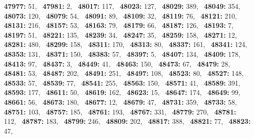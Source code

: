 \textbf{47977:} 51,\allowbreak~ 
\textbf{47981:} 2,\allowbreak~ 
\textbf{48017:} 117,\allowbreak~ 
\textbf{48023:} 127,\allowbreak~ 
\textbf{48029:} 389,\allowbreak~ 
\textbf{48049:} 354,\allowbreak~ 
\textbf{48073:} 120,\allowbreak~ 
\textbf{48079:} 54,\allowbreak~ 
\textbf{48091:} 89,\allowbreak~ 
\textbf{48109:} 32,\allowbreak~ 
\textbf{48119:} 76,\allowbreak~ 
\textbf{48121:} 210,\allowbreak~ 
\textbf{48131:} 216,\allowbreak~ 
\textbf{48157:} 53,\allowbreak~ 
\textbf{48163:} 79,\allowbreak~ 
\textbf{48179:} 66,\allowbreak~ 
\textbf{48187:} 126,\allowbreak~ 
\textbf{48193:} 7,\allowbreak~ 
\textbf{48197:} 51,\allowbreak~ 
\textbf{48221:} 135,\allowbreak~ 
\textbf{48239:} 34,\allowbreak~ 
\textbf{48247:} 35,\allowbreak~ 
\textbf{48259:} 158,\allowbreak~ 
\textbf{48271:} 12,\allowbreak~ 
\textbf{48281:} 480,\allowbreak~ 
\textbf{48299:} 158,\allowbreak~ 
\textbf{48311:} 170,\allowbreak~ 
\textbf{48313:} 80,\allowbreak~ 
\textbf{48337:} 161,\allowbreak~ 
\textbf{48341:} 124,\allowbreak~ 
\textbf{48353:} 131,\allowbreak~ 
\textbf{48371:} 150,\allowbreak~ 
\textbf{48383:} 57,\allowbreak~ 
\textbf{48397:} 5,\allowbreak~ 
\textbf{48407:} 134,\allowbreak~ 
\textbf{48409:} 178,\allowbreak~ 
\textbf{48413:} 97,\allowbreak~ 
\textbf{48437:} 3,\allowbreak~ 
\textbf{48449:} 41,\allowbreak~ 
\textbf{48463:} 150,\allowbreak~ 
\textbf{48473:} 67,\allowbreak~ 
\textbf{48479:} 28,\allowbreak~ 
\textbf{48481:} 53,\allowbreak~ 
\textbf{48487:} 202,\allowbreak~ 
\textbf{48491:} 251,\allowbreak~ 
\textbf{48497:} 108,\allowbreak~ 
\textbf{48523:} 80,\allowbreak~ 
\textbf{48527:} 148,\allowbreak~ 
\textbf{48533:} 57,\allowbreak~ 
\textbf{48539:} 77,\allowbreak~ 
\textbf{48541:} 255,\allowbreak~ 
\textbf{48563:} 150,\allowbreak~ 
\textbf{48571:} 41,\allowbreak~ 
\textbf{48589:} 391,\allowbreak~ 
\textbf{48593:} 177,\allowbreak~ 
\textbf{48611:} 50,\allowbreak~ 
\textbf{48619:} 162,\allowbreak~ 
\textbf{48623:} 15,\allowbreak~ 
\textbf{48647:} 174,\allowbreak~ 
\textbf{48649:} 99,\allowbreak~ 
\textbf{48661:} 56,\allowbreak~ 
\textbf{48673:} 180,\allowbreak~ 
\textbf{48677:} 12,\allowbreak~ 
\textbf{48679:} 47,\allowbreak~ 
\textbf{48731:} 359,\allowbreak~ 
\textbf{48733:} 58,\allowbreak~ 
\textbf{48751:} 103,\allowbreak~ 
\textbf{48757:} 185,\allowbreak~ 
\textbf{48761:} 193,\allowbreak~ 
\textbf{48767:} 331,\allowbreak~ 
\textbf{48779:} 270,\allowbreak~ 
\textbf{48781:} 112,\allowbreak~ 
\textbf{48787:} 183,\allowbreak~ 
\textbf{48799:} 246,\allowbreak~ 
\textbf{48809:} 202,\allowbreak~ 
\textbf{48817:} 388,\allowbreak~ 
\textbf{48821:} 77,\allowbreak~ 
\textbf{48823:} 47,\allowbreak~ 
